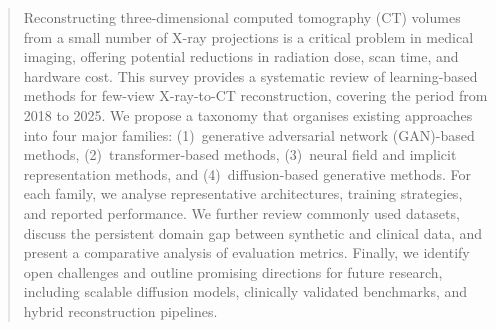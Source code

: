 
\begin{abstract}
Reconstructing three-dimensional computed tomography (CT) volumes from a small number of X-ray projections is a critical problem in medical imaging, offering potential reductions in radiation dose, scan time, and hardware cost. This survey provides a systematic review of learning-based methods for few-view X-ray-to-CT reconstruction, covering the period from 2018 to 2025. We propose a taxonomy that organises existing approaches into four major families: (1)~generative adversarial network (GAN)-based methods, (2)~transformer-based methods, (3)~neural field and implicit representation methods, and (4)~diffusion-based generative methods. For each family, we analyse representative architectures, training strategies, and reported performance. We further review commonly used datasets, discuss the persistent domain gap between synthetic and clinical data, and present a comparative analysis of evaluation metrics. Finally, we identify open challenges and outline promising directions for future research, including scalable diffusion models, clinically validated benchmarks, and hybrid reconstruction pipelines.
\end{abstract}
